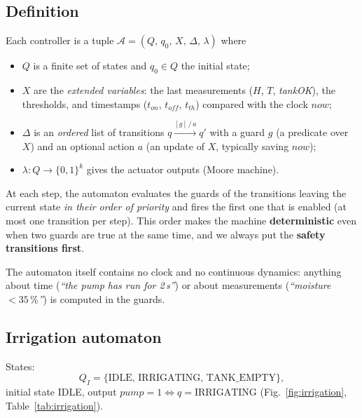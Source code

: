 \documentclass[10pt,a4paper,twocolumn]{article}
\begin{document}
\subsection{Definition}
Each controller is a tuple $\mathcal{A}=(Q,\,q_0,\,X,\,\Delta,\,\lambda)$ where
\begin{itemize}
  \item $Q$ is a finite set of states and $q_0\in Q$ the initial state;
  \item $X$ are the \emph{extended variables}: the last measurements
        ($H$, $T$, \textit{tankOK}), the thresholds, and timestamps
        ($t_{on}$, $t_{off}$, $t_{th}$) compared with the clock $\mathit{now}$;
  \item $\Delta$ is an \emph{ordered} list of transitions
        $q\xrightarrow{[g]\,/\,a}q'$ with a guard $g$ (a predicate over $X$) and an
        optional action $a$ (an update of $X$, typically saving $\mathit{now}$);
  \item $\lambda:Q\to\{0,1\}^k$ gives the actuator outputs (Moore machine).
\end{itemize}
At each step, the automaton evaluates the guards of the transitions leaving the
current state \emph{in their order of priority} and fires the first one that is
enabled (at most one transition per step). This order makes the machine
\textbf{deterministic} even when two guards are true at the same time, and we always
put the \textbf{safety transitions first}.

The automaton itself contains no clock and no continuous dynamics: anything about time
(\emph{``the pump has run for 2\,s''}) or about measurements (\emph{``moisture
$<35\,\%$''}) is computed in the guards.

\subsection{Irrigation automaton}
States:
\[Q_I=\{\text{IDLE},\,\text{IRRIGATING},\,\text{TANK\_EMPTY}\},\]
initial state IDLE, output $\mathit{pump}=1 \iff q=\text{IRRIGATING}$ (Fig.~\ref{fig:irrigation},
Table~\ref{tab:irrigation}).
\end{document}

